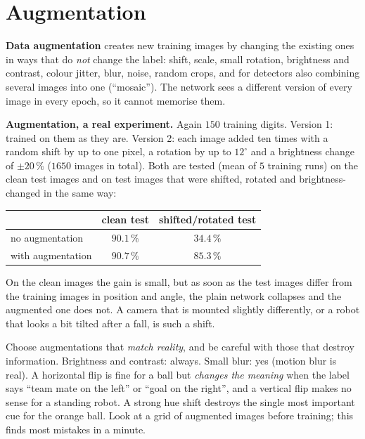 \section*{Augmentation}
\textbf{Data augmentation} creates new training images by changing the existing ones in ways that do \emph{not} change the label: shift, scale, small rotation, brightness and contrast, colour jitter, blur, noise, random crops, and for detectors also combining several images into one (``mosaic''). The network sees a different version of every image in every epoch, so it cannot memorise them.
\begin{example}
\textbf{Augmentation, a real experiment.} Again $150$ training digits. Version 1: trained on them as they are. Version 2: each image added ten times with a random shift by up to one pixel, a rotation by up to $12^\circ$ and a brightness change of $\pm20\,\%$ ($1650$ images in total). Both are tested (mean of $5$ training runs) on the clean test images and on test images that were shifted, rotated and brightness-changed in the same way:
\begin{center}
\renewcommand{\arraystretch}{1.2}
\begin{tabular}{lcc}
 & \textbf{clean test} & \textbf{shifted/rotated test}\\ \hline
no augmentation & $90.1\,\%$ & $34.4\,\%$\\
with augmentation & $90.7\,\%$ & $85.3\,\%$\\
\end{tabular}
\end{center}
On the clean images the gain is small, but as soon as the test images differ from the training images in position and angle, the plain network collapses and the augmented one does not. A camera that is mounted slightly differently, or a robot that looks a bit tilted after a fall, is such a shift.
\end{example}
Choose augmentations that \emph{match reality}, and be careful with those that destroy information. Brightness and contrast: always. Small blur: yes (motion blur is real). A horizontal flip is fine for a ball but \emph{changes the meaning} when the label says ``team mate on the left'' or ``goal on the right'', and a vertical flip makes no sense for a standing robot. A strong hue shift destroys the single most important cue for the orange ball. Look at a grid of augmented images before training; this finds most mistakes in a minute.

